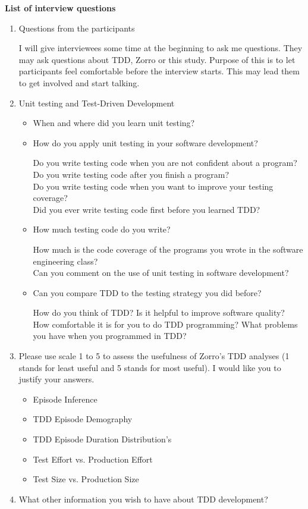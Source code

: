 \noindent \textbf{List of interview questions}
\begin{enumerate}
\item {Questions from the participants}

I will give interviewees some time at the beginning to ask me
questions. They may ask questions about TDD, Zorro or this
study. Purpose of this is to let participants feel comfortable before
the interview starts. This may lead them to get involved and start
talking.

\item {Unit testing and Test-Driven Development}

\begin{itemize}
  \item {When and where did you learn unit testing?}
  \item {How do you apply unit testing in your software development?} 
  
  Do you write testing code when you are not confident about a program? \\
  Do you write testing code after you finish a program? \\
  Do you write testing code when you want to improve your testing coverage? \\
  Did you ever write testing code first before you learned TDD?
  
  \item {How much testing code do you write?}

  How much is the code coverage of the programs you wrote in the software engineering class? \\
  Can you comment on the use of unit testing in software development?
  
  \item {Can you compare TDD to the testing strategy you did before?}
  
  How do you think of TDD? Is it helpful to improve software quality? \\ 
  How comfortable it is for you to do TDD programming?
  What problems you have when you programmed in TDD?
\end{itemize} 
 
\item {Please use scale 1 to 5 to assess the usefulness of Zorro's TDD analyses (1 stands for least useful and 5 stands for most useful). I would like you to justify your answers.}
    \begin{itemize}
      \item{Episode Inference}            
      \item{TDD Episode Demography}
      \item{TDD Episode Duration Distribution's}
      \item{Test Effort vs. Production Effort}
      \item{Test Size vs. Production Size}
    \end{itemize}
\item {What other information you wish to have about TDD development?}
  

\end{enumerate}
